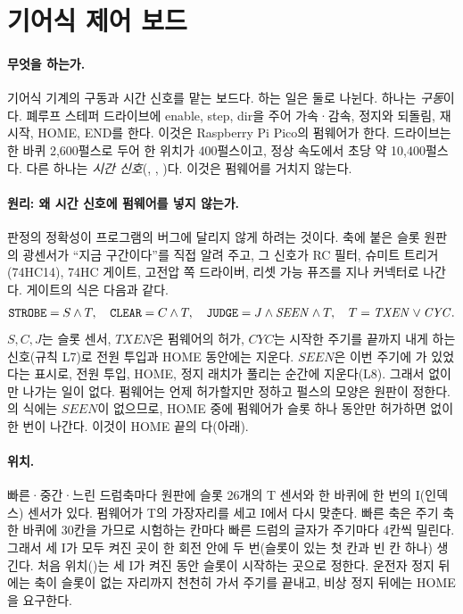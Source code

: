 
\section{기어식 제어 보드}\label{sch:gear-control}

\paragraph{무엇을 하는가.} 기어식 기계의 구동과 시간 신호를 맡는 보드다. 하는 일은 둘로 나뉜다. 하나는 \emph{구동}이다.
폐루프 스테퍼 드라이브에 enable, step, dir을 주어 가속·감속, 정지와 되돌림, 재시작, HOME, END를 한다. 이것은
Raspberry Pi Pico의 펌웨어가 한다. 드라이브는 한 바퀴 2,600펄스로 두어 한 위치가 400펄스이고, 정상 속도에서
초당 약 10,400펄스다. 다른 하나는 \emph{시간 신호}(, , )다. 이것은 펌웨어를 거치지
않는다.

\paragraph{원리: 왜 시간 신호에 펌웨어를 넣지 않는가.} 판정의 정확성이 프로그램의 버그에 달리지 않게 하려는 것이다.
축에 붙은 슬롯 원판의 광센서가 ``지금  구간이다''를 직접 알려 주고, 그 신호가 RC 필터, 슈미트 트리거
(74HC14), 74HC 게이트, 고전압 쪽 드라이버, 리셋 가능 퓨즈를 지나 커넥터로 나간다. 게이트의 식은 다음과 같다.
\[
\texttt{STROBE} = S \wedge T,\quad \texttt{CLEAR} = C \wedge T,\quad \texttt{JUDGE} = J \wedge \mathit{SEEN} \wedge T,\quad
T = \mathit{TXEN} \vee \mathit{CYC}.
\]
$S, C, J$는 슬롯 센서, $\mathit{TXEN}$은 펌웨어의 허가, $\mathit{CYC}$는 시작한 주기를 끝까지 내게 하는 신호(규칙 L7)로
전원 투입과 HOME 동안에는 지운다.
$\mathit{SEEN}$은 이번 주기에 가 있었다는 표시로, 전원 투입, HOME, 정지 래치가 풀리는 순간에 지운다(L8).
그래서  없이 만 나가는 일이 없다. 펌웨어는 언제 허가할지만 정하고 펄스의 모양은 원판이 정한다.
의 식에는 $\mathit{SEEN}$이 없으므로, HOME 중에 펌웨어가  슬롯 하나 동안만 허가하면
 없이  한 번이 나간다. 이것이 HOME 끝의 다(아래).

\paragraph{위치.} 빠른·중간·느린 드럼축마다 원판에 슬롯 26개의 T 센서와 한 바퀴에 한 번의 I(인덱스) 센서가 있다. 펌웨어가
T의 가장자리를 세고 I에서 다시 맞춘다. 빠른 축은 주기 축 한 바퀴에 30칸을 가므로 시험하는 칸마다 빠른 드럼의 글자가
주기마다 4칸씩 밀린다. 그래서 세 I가 모두 켜진 곳이 한 회전 안에 두 번(슬롯이 있는 첫 칸과 빈 칸 하나) 생긴다. 처음
위치()는 세 I가 켜진 동안  슬롯이 시작하는 곳으로 정한다. 운전자 정지 뒤에는 축이
슬롯이 없는 자리까지 천천히 가서 주기를 끝내고, 비상 정지 뒤에는 HOME을 요구한다.

